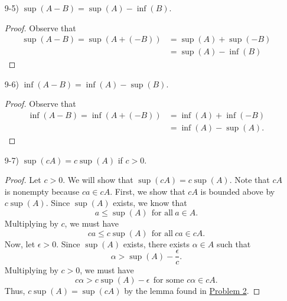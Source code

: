 \documentclass[11pt,a4paper]{article}
\begin{document}
\begin{enumerate}
\begin{enumerate}
\begin{proof}
                Now, let \( \epsilon > 0 \). Since \( \sup (A)  \) exists, there exists \( \gamma \in A  \) such that  
                \[  \gamma > \sup A - \epsilon. \]
                Multiplying by a negative, we get
                \[  - \gamma < - \sup A + \epsilon  \]
                for some \( -\gamma \in -A  \), which shows (ii). By the lemma found in {\hyperref[Problem 3]{Problem 3}}, we conclude that \( \inf(-A) = - \sup(A) \).
            \end{proof}
        \item[9-5)] \( \sup (A -B) = \sup(A) - \inf(B) \).
            \begin{proof}
            Observe that 
            \begin{align*}
                \sup(A - B) = \sup(A + (-B)) &= \sup(A) + \sup(-B) \tag{9-2)} \\
                                             &= \sup(A) - \inf(B) \tag{9-3)}
            \end{align*}
            \end{proof}
        \item[9-6)] \( \inf(A - B) = \inf(A) - \sup(B) \).
            \begin{proof}
            Observe that
            \begin{align*}
                \inf(A -B) = \inf(A + (-B)) &= \inf(A) + \inf(-B) \tag{9-1)} \\
                                            &= \inf(A) - \sup(A). \tag{9-4)}
            \end{align*}
            \end{proof}
        \item[9-7)] \( \sup(cA) = c \sup (A)  \) if \( c > 0  \).
               \begin{proof}
                   Let \( c > 0  \). We will show that \( \sup(cA) = c \sup(A) \). Note that \( cA  \) is nonempty because \( ca \in cA  \). First, we show that \( cA  \) is bounded above by \( c \sup(A) \). Since \( \sup(A) \) exists, we know that  
                   \[  a \leq \sup(A) \ \ \text{for all} \ a \in A.   \]
                   Multiplying by \( c  \), we must have
                   \[  ca \leq c \sup(A) \ \ \text{for all} \  ca \in cA. \]
                   Now, let \( \epsilon > 0 \). Since \( \sup(A)  \) exists, there exists \( \alpha \in A  \) such that   
                   \[  \alpha > \sup(A) - \frac{ \epsilon }{ c }.  \]
                   Multiplying by \( c > 0  \), we must have
                   \[  c \alpha > c \sup(A) - \epsilon \ \ \text{for some } c \alpha \in cA.   \]
                   Thus, \( c \sup(A) = \sup(cA) \) by the lemma found in {\hyperref[Problem 2]{Problem 2}}. 


\end{proof}
\end{enumerate}
\end{enumerate}
\end{document}
